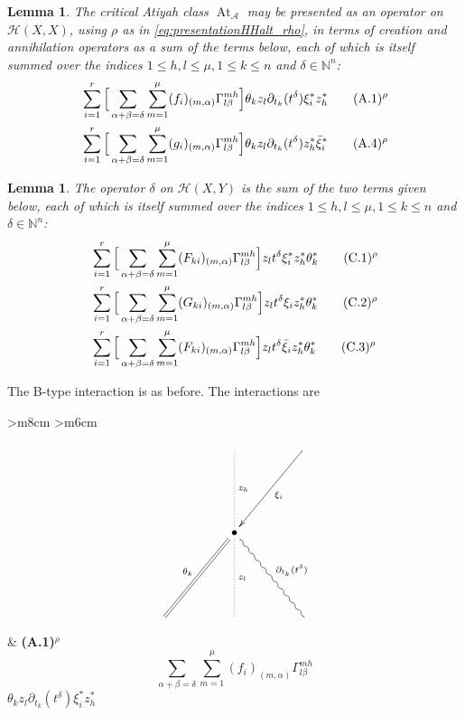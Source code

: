 \documentclass[english,letter paper,12pt,leqno]{article}
\newtheorem{lemma}[theorem]{Lemma}
\theoremstyle{example}
\numberwithin{equation}{section}
\def\AA{\mathcal{A}}
\def\HH{\HH}
\def\HH{\mathcal{H}}
\DeclareMathOperator{\vAt}{At}
\begin{document}
\begin{lemma}
The critical Atiyah class $\vAt_{\AA}$ may be presented as an operator on $\HH(X,X)$, using $\rho$ as in \eqref{eq:presentationHHalt_rho}, in terms of creation and annihilation operators as a sum of the terms below, each of which is itself summed over the indices $1 \le h,l \le \mu, 1 \le k \le n$ and $\delta \in \mathbb{N}^n$:
\begin{align}
&\sum_{i=1}^r \Big[ \sum_{\alpha + \beta = \delta } \sum_{m=1}^\mu (f_i)_{(m,\alpha)} \Gamma^{mh}_{l\beta} \Big] \theta_k z_l \partial_{t_k}(t^\delta) \xi_i^* z_h^*  \qquad (\textup{A}.1)^\rho \label{eq:a3vertex_rho}\\
&\sum_{i=1}^r \Big[ \sum_{\alpha + \beta = \delta } \sum_{m=1}^\mu (g_i)_{(m,\alpha)} \Gamma^{mh}_{l\beta} \Big] \theta_k z_l \partial_{t_k}(t^\delta) z_h^* \Bar{\xi}_i^* \qquad (\textup{A}.4)^\rho \label{eq:a4vertex_rho}
\end{align}
\end{lemma}

\begin{lemma}
The operator $\delta$ on $\HH(X,Y)$ is the sum of the two terms given below, each of which is itself summed over the indices $1 \le h,l \le \mu, 1 \le k \le n$ and $\delta \in \mathbb{N}^n$:
\begin{align}
& \sum_{i=1}^r \Big[ \sum_{\alpha + \beta = \delta } \sum_{m=1}^\mu (F_{ki})_{(m,\alpha)} \Gamma^{m h}_{l \beta} \Big] z_{l} t^\delta \xi_i^* z_h^* \theta_k^* \qquad (\textup{C}.1)^\rho\label{eq:c1vertex_rho}\\
& \sum_{i=1}^r \Big[ \sum_{\alpha + \beta = \delta } \sum_{m=1}^\mu (G_{ki})_{(m,\alpha)} \Gamma^{m h}_{l \beta} \Big] z_{l} t^\delta \xi_i z_h^* \theta_k^* \qquad (\textup{C}.2)^\rho\label{eq:c2vertex_rho}\\
& \sum_{i=1}^r \Big[ \sum_{\alpha + \beta = \delta } \sum_{m=1}^\mu (F_{ki})_{(m,\alpha)} \Gamma^{m h}_{l \beta} \Big] z_{l} t^\delta \Bar{\xi}_i z_h^* \theta_k^* \qquad (\textup{C}.3)^\rho\label{eq:c3vertex_rho}
\end{align}
\end{lemma}

The B-type interaction is as before. The interactions are

\begin{center}
\begin{tabular}{ >{\centering}m{8cm} >{\centering}m{6cm} }
\[
\xymatrix@C+2pc@R+3pc{
& & \ar@{.}[d]^-{z_h} & \ar[dl]^-{\xi_i}\\
& & \bullet \ar@{=}[dl]_-{\theta_k} \ar@{.}[d]^-{z_l} \ar@{~}[dr]^-{\partial_{t_k}(t^\delta)}\\
& & & & 
}
\]
&
\textbf{(A.1)${}^\rho$}
\vspace{1cm}
\[\sum_{\alpha + \beta = \delta } \sum_{m=1}^\mu (f_i)_{(m,\alpha)} \Gamma^{mh}_{l\beta}\]
\vspace{0.5cm}
$\theta_k z_l \partial_{t_k}(t^\delta) \xi_i^* z_h^*$
\end{tabular}
\end{center}
\end{document}

